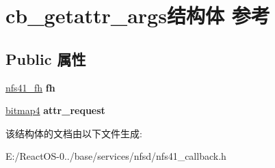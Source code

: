 \hypertarget{structcb__getattr__args}{}\section{cb\+\_\+getattr\+\_\+args结构体 参考}
\label{structcb__getattr__args}
\subsection*{Public 属性}
\begin{DoxyCompactItemize}
\item 
\mbox{\label{structcb__getattr__args_a1088adea65286fc0e0054831d8025383}} 
\hyperlink{struct____nfs41__fh}{nfs41\+\_\+fh} {\bfseries fh}
\item 
\mbox{\label{structcb__getattr__args_ae528ef1a52d8f4654f3268224dfb59d8}} 
\hyperlink{struct____bitmap4}{bitmap4} {\bfseries attr\+\_\+request}
\end{DoxyCompactItemize}


该结构体的文档由以下文件生成\+:\begin{DoxyCompactItemize}
\item 
E\+:/\+React\+O\+S-\/0../base/services/nfsd/nfs41\+\_\+callback.\+h\end{DoxyCompactItemize}
